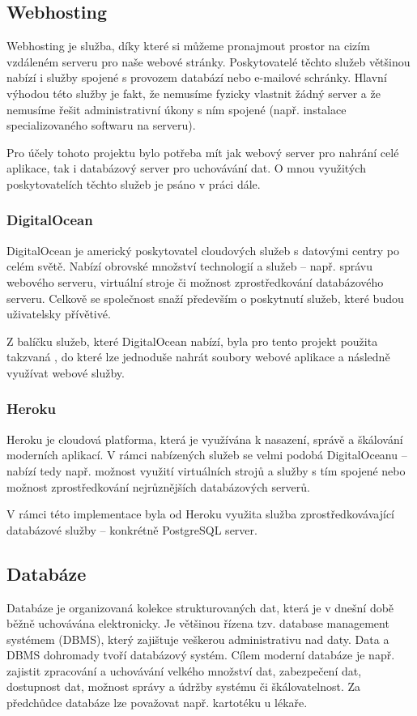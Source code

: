 	\subsection{Webhosting}
	Webhosting je služba, díky které si můžeme pronajmout prostor na cizím vzdáleném serveru pro naše webové stránky. Poskytovatelé těchto služeb většinou nabízí i služby spojené s provozem databází nebo e-mailové schránky. Hlavní výhodou této služby je fakt, že nemusíme fyzicky vlastnit žádný server a že nemusíme řešit administrativní úkony s ním spojené (např. instalace specializovaného softwaru na serveru). \cite{Webhosting}
	
	Pro účely tohoto projektu bylo potřeba mít jak webový server pro nahrání celé aplikace, tak i databázový server pro uchovávání dat. O mnou využitých poskytovatelích těchto služeb je psáno v práci dále. 
	
		\subsubsection{DigitalOcean}
		DigitalOcean je americký poskytovatel cloudových služeb s datovými centry po celém světě. Nabízí obrovské množství technologií a služeb – např. správu webového serveru, virtuální stroje či možnost zprostředkování databázového serveru. Celkově se společnost snaží především o poskytnutí služeb, které budou uživatelsky přívětivé. \cite{DO1} \cite{DO2}
		
		Z balíčku služeb, které DigitalOcean nabízí, byla pro tento projekt použita takzvaná  \cite{DO3}, do které lze jednoduše nahrát soubory webové aplikace a následně využívat webové služby.
		
		\subsubsection{Heroku}
		Heroku je cloudová platforma, která je využívána k nasazení, správě a škálování moderních aplikací. V rámci nabízených služeb se velmi podobá DigitalOceanu – nabízí tedy např. možnost využití virtuálních strojů a služby s tím spojené nebo možnost zprostředkování nejrůznějších databázových serverů. \cite{Heroku1} \cite{Heroku2}
		
		V rámci této implementace byla od Heroku využita služba zprostředkovávající databázové služby – konkrétně PostgreSQL server. 
		
	\subsection{Databáze}
	Databáze je organizovaná kolekce strukturovaných dat, která je v dnešní době běžně uchovávána elektronicky. Je většinou řízena tzv. database management systémem (DBMS), který zajištuje veškerou administrativu nad daty. Data a DBMS dohromady tvoří databázový systém. Cílem moderní databáze je např. zajistit zpracování a uchovávání velkého množství dat, zabezpečení dat, dostupnost dat, možnost správy a údržby systému či škálovatelnost. Za předchůdce databáze lze považovat např. kartotéku u lékaře. \cite{DBSummary}
	
